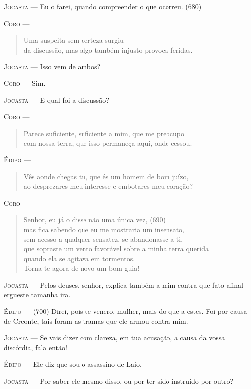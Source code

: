 \textsc{Jocasta} --- Eu o farei, quando compreender o que ocorreu. (680)

\textsc{Coro} --- \begin{verse}Uma suspeita sem certeza surgiu\\
da discussão, mas algo também injusto provoca feridas.
\end{verse}

\textsc{Jocasta} --- Isso vem de ambos?

\textsc{Coro} --- Sim.

\textsc{Jocasta} --- E qual foi a discussão?

\textsc{Coro} --- \begin{verse}Parece suficiente, suficiente a mim, que me preocupo\\
com nossa terra, que isso permaneça aqui, onde cessou.
\end{verse}

\textsc{Édipo} --- \begin{verse}Vês aonde chegas tu, que és um homem de bom juízo,\\
ao desprezares meu interesse e embotares meu coração?
\end{verse}

\textsc{Coro} --- \begin{verse}Senhor, eu já o disse não uma única vez, (690)\\
mas fica sabendo que eu me mostraria um insensato,\\
sem acesso a qualquer sensatez, se abandonasse a ti,\\
que sopraste um vento favorável sobre a minha terra querida\\
quando ela se agitava em tormentos.\\
Torna-te agora de novo um bom guia!
\end{verse}

\textsc{Jocasta} --- Pelos deuses, senhor, explica também a mim contra que fato afinal
ergueste tamanha ira.

\textsc{Édipo} --- (700) Direi, pois te venero, mulher, mais do que a estes. Foi por causa
de Creonte, tais foram as tramas que ele armou contra mim.

\textsc{Jocasta} --- Se vais dizer com clareza, em tua acusação, a causa da vossa discórdia,
fala então!

\textsc{Édipo} --- Ele diz que sou o assassino de Laio.

\textsc{Jocasta} --- Por saber ele mesmo disso, ou por ter sido instruído por outro?

